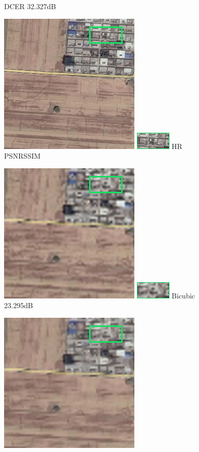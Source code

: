 \documentclass[runningheads,a4paper]{llncs}
\begin{document}
\begin{figure}[htbp]
\begin{minipage}{1.3cm}
    {DCER \newline32.327dB}
    \end{minipage}
    \qquad
    \begin{minipage}{1.3cm}
    \includegraphics[scale=0.2]{pic/4x/hr/35.png}
    \includegraphics[scale=0.8]{pic/4x/hr/small-35.png}
    {HR \newline PSNR\newline SSIM}
    \end{minipage}
    \qquad
    \begin{minipage}{1.3cm}
    \includegraphics[scale=0.2]{pic/4x/bicu/pick-35.png}
    \includegraphics[scale=0.8]{pic/4x/bicu/small-35.png}
    {Bicubic \newline 23.295dB}
    \end{minipage}
    \qquad
    \begin{minipage}{1.4cm}
     \includegraphics[scale=0.2]{pic/4x/srcnn/pick-35.png}

\end{minipage}
\end{figure}
\end{document}
